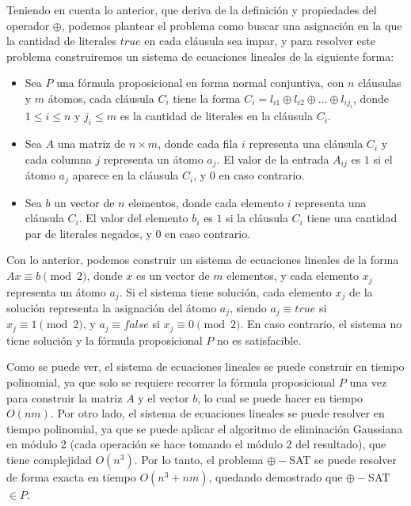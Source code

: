 \documentclass[letterpaper, 12pt]{article}
\begin{document}
\begin{enumerate}
Teniendo en cuenta lo anterior, que deriva de la definición y propiedades del operador $\oplus$, podemos plantear el problema como buscar una asignación en la que la cantidad de literales $true$ en cada cláusula sea impar, y para resolver este problema construiremos un sistema de ecuaciones lineales de la siguiente forma:

\begin{itemize}
    \item Sea $P$ una fórmula proposicional en forma normal conjuntiva, con $n$ cláusulas y $m$ átomos, cada cláusula $C_i$ tiene la forma $C_i = l_{i1} \oplus l_{i2} \oplus \dots \oplus l_{ij_i}$, donde $1 \leq i \leq n$ y $j_i \leq m$ es la cantidad de literales en la cláusula $C_i$.
    \item Sea $A$ una matriz de $n \times m$, donde cada fila $i$ representa una cláusula $C_i$ y cada columna $j$ representa un átomo $a_j$. El valor de la entrada $A_{ij}$ es $1$ si el átomo $a_j$ aparece en la cláusula $C_i$, y $0$ en caso contrario.
    \item Sea $b$ un vector de $n$ elementos, donde cada elemento $i$ representa una cláusula $C_i$. El valor del elemento $b_i$ es $1$ si la cláusula $C_i$ tiene una cantidad par de literales negados, y $0$ en caso contrario.
\end{itemize}

Con lo anterior, podemos construir un sistema de ecuaciones lineales de la forma $Ax \equiv b \pmod{2}$, donde $x$ es un vector de $m$ elementos, y cada elemento $x_j$ representa un átomo $a_j$. Si el sistema tiene solución, cada elemento $x_j$ de la solución representa la asignación del átomo $a_j$, siendo $a_j \equiv true$ si $x_j \equiv 1 \pmod{2}$, y $a_j \equiv false$ si $x_j \equiv 0 \pmod{2}$. En caso contrario, el sistema no tiene solución y la fórmula proposicional $P$ no es satisfacible.

Como se puede ver, el sistema de ecuaciones lineales se puede construir en tiempo polinomial, ya que solo se requiere recorrer la fórmula proposicional $P$ una vez para construir la matriz $A$ y el vector $b$, lo cual se puede hacer en tiempo $O(nm)$. Por otro lado, el sistema de ecuaciones lineales se puede resolver en tiempo polinomial, ya que se puede aplicar el algoritmo de eliminación Gaussiana en módulo 2 (cada operación se hace tomando el módulo 2 del resultado), que tiene complejidad $O(n^3)$. Por lo tanto, el problema $\oplus-$SAT se puede resolver de forma exacta en tiempo $O(n^3 + nm)$, quedando demostrado que $\oplus-$SAT $\in P$. \\

\end{enumerate} \vspace{4mm}
\end{document}
